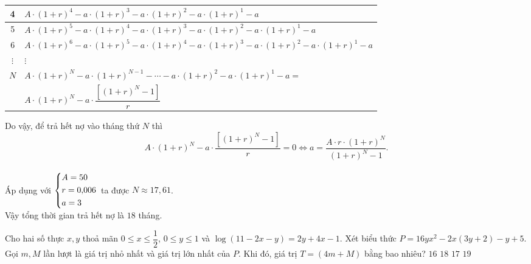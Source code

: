 \begin{ex}
{\begin{center}
{\begin{tabular}{|c|l|}
				4&$ A\cdot (1+r)^4-a\cdot (1+r)^3-a\cdot (1+r)^2-a\cdot (1+r)^1-a $\\ \hline
				5&$ A\cdot (1+r)^5-a\cdot (1+r)^4-a\cdot (1+r)^3-a\cdot (1+r)^2-a\cdot (1+r)^1-a $\\ \hline
				6 &$ A\cdot (1+r)^6-a\cdot (1+r)^5-a\cdot (1+r)^4-a\cdot (1+r)^3-a\cdot (1+r)^2-a\cdot (1+r)^1-a $\\ \hline
				$ \vdots $&$\vdots \phantom{MMMMMMMMMMMMMMMMMM} $ \\ \hline
				\multirow{2}{0.1cm}{$ N $ }
				& $A\cdot (1+r)^N-a\cdot (1+r)^{N-1}-\cdots-a\cdot (1+r)^2-a\cdot (1+r)^1-a =$\\
				&
				$A\cdot (1+r)^N-a\cdot \dfrac{\left [(1+r)^N-1\right ]}{r}$ \\   \hline
			\end{tabular}
		}
	\end{center} 
	Do vậy, để trả hết nợ vào tháng thứ $ N $ thì $$ A\cdot (1+r)^N-a\cdot \dfrac{\left [(1+r)^N-1\right ]}{r}= 0 \Leftrightarrow a = \dfrac{A\cdot r\cdot (1+r)^N}{(1+r)^N-1}.$$
	\\
Áp dụng với $ \left\{\begin{aligned}&A = 50 \\ &r = 0{ , }006 \\ & a = 3   \end{aligned}\right. $ ta được $ N \approx 17{ , }61 $. \\
Vậy tổng thời gian trả hết nợ là $ 18 $ tháng.
	}	
\end{ex}	
\begin{ex}%
	Cho hai số thực $ x, y $ thoả mãn $ 0 \leq x \leq \dfrac{1}{2} $, $ 0 \leq y \leq 1 $ và $ \log (11 - 2x - y) = 2y + 4x -1 $.  Xét biểu thức $ P = 16yx^2 - 2x(3y + 2) - y + 5 $. Gọi $ m, M $ lần lượt là giá trị nhỏ nhất và giá trị lớn nhất của $ P $. Khi đó, giá trị $ T = ( 4m  + M )$ bằng bao nhiêu?
	\choice
	{\True $ 16 $}
	{$ 18 $}
	{$ 17 $}
	{$ 19 $}
\end{ex}	

